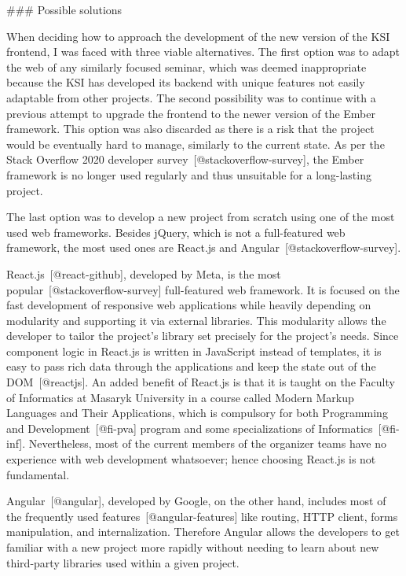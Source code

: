 \documentclass[
  digital, %
  oneside, %
  lof,     %
  nolot,     %
]{fithesis4}
\begin{document}
### Possible solutions

When deciding how to approach the development of the new version of the \acrshort{KSI} frontend, I was faced with three viable alternatives. The first option was to adapt the web of any similarly focused seminar, which was deemed inappropriate because the \acrshort{KSI} has developed its backend with unique features not easily adaptable from other projects. The second possibility was to continue with a previous attempt to upgrade the frontend to the newer version of the Ember framework. This option was also discarded as there is a risk that the project would be eventually hard to manage, similarly to the current state. As per the Stack Overflow 2020 developer survey~[@stackoverflow-survey], the Ember framework is no longer used regularly and thus unsuitable for a long-lasting project.

The last option was to develop a new project from scratch using one of the most used web frameworks. Besides jQuery, which is not a full-featured web framework, the most used ones are React.js and Angular~[@stackoverflow-survey].

React.js~[@react-github], developed by Meta, is the most popular~[@stackoverflow-survey] full-featured web framework. It is focused on the fast development of responsive web applications while heavily depending on modularity and supporting it via external libraries. This modularity allows the developer to tailor the project's library set precisely for the project's needs. Since component logic in React.js is written in JavaScript instead of templates, it is easy to pass rich data through the applications and keep the state out of the DOM~[@reactjs]. An added benefit of React.js is that it is taught on the Faculty of Informatics at Masaryk University in a course called Modern Markup Languages and Their Applications, which is compulsory for both
Programming and Development~[@fi-pva] program and some specializations of Informatics~[@fi-inf]. Nevertheless, most of the current members of the organizer teams have no experience with web development whatsoever; hence choosing React.js is not fundamental.

Angular~[@angular], developed by Google, on the other hand, includes most of the frequently used features~[@angular-features] like routing, \acrshort{HTTP} client, forms manipulation, and internalization. Therefore Angular allows the developers to get familiar with a new project more rapidly without needing to learn about new third-party libraries used within a given project.
\end{document}
